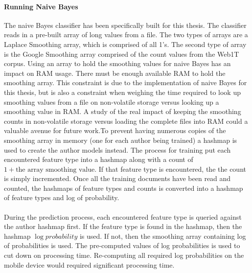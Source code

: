 	\paragraph{Running Naive Bayes} The naive Bayes classifier has been specifically built for this thesis.  The classifier reads in a pre-built array of long values from a file.  The two types of arrays are a Laplace Smoothing array, which is comprised of all 1's. The second type of array is the Google Smoothing array comprised of the count values from the Web1T corpus.  Using an array to hold the smoothing values for naive Bayes has an impact on RAM usage.  There must be enough available RAM to hold the smoothing array.  This constraint is due to the implementation of naive Bayes for this thesis, but is also a constraint when weighing the time required to look up smoothing values from a file on non-volatile storage versus looking up a smoothing value in RAM.  A study of the real impact of keeping the smoothing counts in non-volatile storage versus loading the complete files into RAM could a valuable avenue for future work.To prevent having numerous copies of the smoothing array in memory (one for each author being trained) a hashmap is used to create the author models instead.  The process for training put each encountered feature type into a hashmap along with a count of $1 +  \text{the array smoothing value}$.  If that feature type is encountered, the the count is simply incremented. Once all the training documents have been read and counted, the hashmaps of feature types and counts is converted into a hashmap of feature types and log of probability.
	
	\paragraph{}During the prediction process, each encountered feature type is queried against the author hashmap first.  If the feature type is found in the hashmap, then the hashmap $\log{probability}$ is used.  If not, then the smoothing array containing log of probabilities is used.  The pre-computed values of log probabilities is used to cut down on processing time.  Re-computing all required log probabilities on the mobile device would required significant processing time. 
